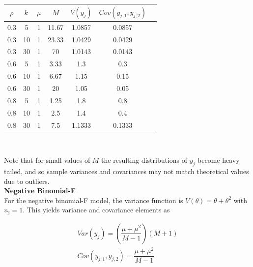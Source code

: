 \documentclass[12pt,epsfig]{article}
\newcommand{\changed}[1]{\textcolor{black}{#1}}
\newcommand{\testlength}{\changed{k}}%
\begin{document}
\begin{centering}
\begin{tabular}{| c |  c | c | c  || c | c | c |} \hline
 $\rho$ & $\testlength$ & $\mu$ & $M$ & $V(y_j)$ & $Cov(y_{j,1}, y_{j,2})$ \\ \hline
 0.3 & 5 & 1 & 11.67 & 1.0857 & 0.0857 \\ 
 0.3 & 10 & 1 & 23.33 & 1.0429 & 0.0429 \\
 0.3 & 30 & 1 & 70 & 1.0143 & 0.0143 \\   
 0.6 & 5 & 1 & 3.33 & 1.3 & 0.3 \\        
 0.6 & 10 & 1 & 6.67 & 1.15 & 0.15 \\     
 0.6 & 30 & 1 & 20 & 1.05 & 0.05 \\       
 0.8 & 5 & 1 & 1.25 & 1.8 & 0.8 \\        
 0.8 & 10 & 1 & 2.5 & 1.4 & 0.4 \\        
 0.8 & 30 & 1 & 7.5 & 1.1333 & 0.1333 \\  \hline
    \end{tabular}\\
\end{centering}
\vspace{0.25in}

\noindent Note that for small values of $M$ the resulting distributions of $y_j$ become heavy tailed, and so sample variances and covariances may not match theoretical values due to outliers.\\

\noindent \textbf{Negative Binomial-F}\\

\noindent For the negative binomial-F model, the variance function is $V(\theta) =\theta +  \theta^2$ with $v_2 =1$. This yields variance and covariance elements as

\begin{gather*}
Var(y_j) =  \left(\dfrac{\mu + \mu^2}{M-1}\right) (M + 1)\\
Cov(y_{j,1}, y_{j,2}) = \dfrac{\mu + \mu^2}{M-1}\\
\end{gather*}
\end{document}
